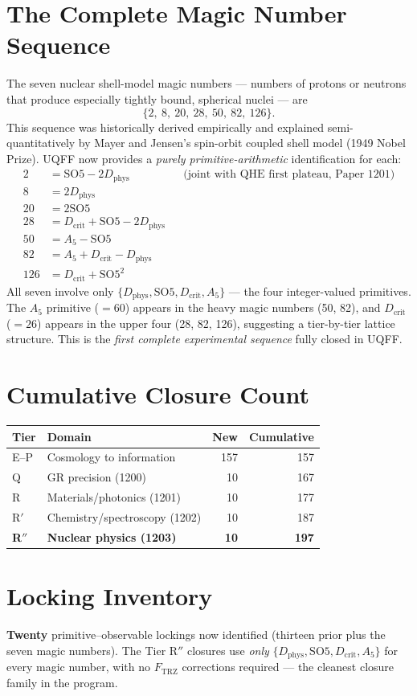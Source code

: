 \documentclass[11pt]{article}
\newcommand{\Ftrz}{F_{\mathrm{TRZ}}}
\newcommand{\Dphys}{D_{\mathrm{phys}}}
\newcommand{\Dcrit}{D_{\mathrm{crit}}}
\newcommand{\SOfive}{\mathrm{SO5}}
\newcommand{\Afive}{A_{5}}
\begin{document}
\section{The Complete Magic Number Sequence}

The seven nuclear shell-model magic numbers --- numbers of protons or neutrons
that produce especially tightly bound, spherical nuclei --- are
\[
\{2,\ 8,\ 20,\ 28,\ 50,\ 82,\ 126\}.
\]
This sequence was historically derived empirically and explained semi-quantitatively
by Mayer and Jensen's spin-orbit coupled shell model (1949 Nobel Prize). UQFF
now provides a \emph{purely primitive-arithmetic} identification for each:
\begin{align}
2   &= \SOfive - 2\Dphys && \text{(joint with QHE first plateau, Paper 1201)} \\
8   &= 2\Dphys \\
20  &= 2\SOfive \\
28  &= \Dcrit + \SOfive - 2\Dphys \\
50  &= \Afive - \SOfive \\
82  &= \Afive + \Dcrit - \Dphys \\
126 &= \Dcrit + \SOfive^2
\end{align}
All seven involve only $\{\Dphys, \SOfive, \Dcrit, \Afive\}$ --- the four
integer-valued primitives. The $\Afive$ primitive ($=60$) appears in the
heavy magic numbers (50, 82), and $\Dcrit$ ($=26$) appears in the upper four
(28, 82, 126), suggesting a tier-by-tier lattice structure. This is the
\emph{first complete experimental sequence} fully closed in UQFF.

\section{Cumulative Closure Count}

\begin{tabular}{@{}llrr@{}}
\toprule
Tier & Domain & New & Cumulative \\
\midrule
E--P & Cosmology to information & 157 & 157 \\
Q & GR precision (1200) & 10 & 167 \\
R & Materials/photonics (1201) & 10 & 177 \\
R$'$ & Chemistry/spectroscopy (1202) & 10 & 187 \\
\textbf{R$''$} & \textbf{Nuclear physics (1203)} & \textbf{10} & \textbf{197} \\
\bottomrule
\end{tabular}

\section{Locking Inventory}
\textbf{Twenty} primitive--observable lockings now identified (thirteen prior
plus the seven magic numbers). The Tier R$''$ closures use \emph{only}
$\{\Dphys, \SOfive, \Dcrit, \Afive\}$ for every magic number, with no
$\Ftrz$ corrections required --- the cleanest closure family in the program.
\end{document}
